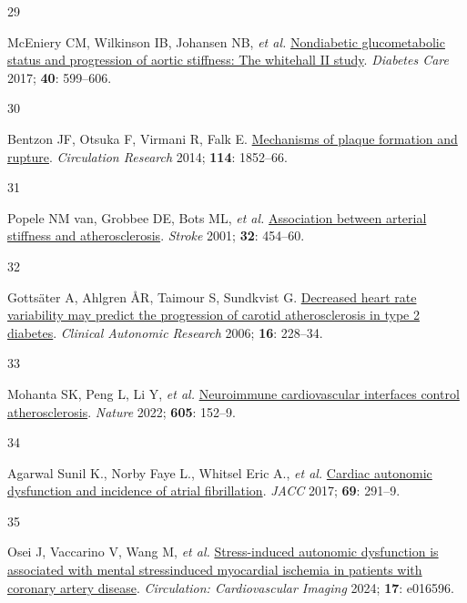 \documentclass[
  a4paper,
  headsepline=true,
  open=any]{scrbook}
\newlength{\cslhangindent}
\newlength{\csllabelwidth}
\newlength{\cslentryspacingunit} %
\newenvironment{CSLReferences}[2] %
 {%
  \setlength{\parindent}{0pt}
  \ifodd #1
  \let\oldpar\par
  \def\par{\hangindent=\cslhangindent\oldpar}
  \fi
  \setlength{\parskip}{#2\cslentryspacingunit}
 }%
 {}
\newcommand{\CSLLeftMargin}[1]{\parbox[t]{\csllabelwidth}{#1}}
\newcommand{\CSLRightInline}[1]{\parbox[t]{\linewidth - \csllabelwidth}{#1}\break}
\begin{document}
\begin{CSLReferences}{0}{0}
\leavevmode{}%
\CSLLeftMargin{29 }%
\CSLRightInline{McEniery CM, Wilkinson IB, Johansen NB, \emph{et al.}
\href{https://doi.org/10.2337/dc16-1773}{Nondiabetic glucometabolic
status and progression of aortic stiffness: The whitehall II study}.
\emph{Diabetes Care} 2017; \textbf{40}: 599--606.}

\leavevmode{}%
\CSLLeftMargin{30 }%
\CSLRightInline{Bentzon JF, Otsuka F, Virmani R, Falk E.
\href{https://doi.org/10.1161/CIRCRESAHA.114.302721}{Mechanisms of
plaque formation and rupture}. \emph{Circulation Research} 2014;
\textbf{114}: 1852--66.}

\leavevmode{}%
\CSLLeftMargin{31 }%
\CSLRightInline{Popele NM van, Grobbee DE, Bots ML, \emph{et al.}
\href{https://doi.org/10.1161/01.STR.32.2.454}{Association between
arterial stiffness and atherosclerosis}. \emph{Stroke} 2001;
\textbf{32}: 454--60.}

\leavevmode{}%
\CSLLeftMargin{32 }%
\CSLRightInline{Gottsäter A, Ahlgren ÅR, Taimour S, Sundkvist G.
\href{https://doi.org/10.1007/s10286-006-0345-4}{Decreased heart rate
variability may predict the progression of carotid atherosclerosis in
type 2 diabetes}. \emph{Clinical Autonomic Research} 2006; \textbf{16}:
228--34.}

\leavevmode{}%
\CSLLeftMargin{33 }%
\CSLRightInline{Mohanta SK, Peng L, Li Y, \emph{et al.}
\href{https://doi.org/10.1038/s41586-022-04673-6}{Neuroimmune
cardiovascular interfaces control atherosclerosis}. \emph{Nature} 2022;
\textbf{605}: 152--9.}

\leavevmode{}%
\CSLLeftMargin{34 }%
\CSLRightInline{Agarwal Sunil K., Norby Faye L., Whitsel Eric A.,
\emph{et al.} \href{https://doi.org/10.1016/j.jacc.2016.10.059}{Cardiac
autonomic dysfunction and incidence of atrial fibrillation}. \emph{JACC}
2017; \textbf{69}: 291--9.}

\leavevmode{}%
\CSLLeftMargin{35 }%
\CSLRightInline{Osei J, Vaccarino V, Wang M, \emph{et al.}
\href{https://doi.org/10.1161/CIRCIMAGING.124.016596}{Stress-induced
autonomic dysfunction is associated with mental
stress{\textendash}induced myocardial ischemia in patients with coronary
artery disease}. \emph{Circulation: Cardiovascular Imaging} 2024;
\textbf{17}: e016596.}


\end{CSLReferences}
\end{document}

